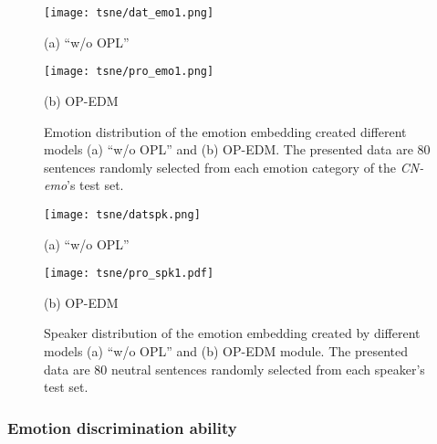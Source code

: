 \documentclass[journal,comsoc]{IEEEtran}
\begin{document}
\begin{figure}[t]
	\centering 
	\begin{minipage}{\linewidth}
		\begin{minipage}{0.49\linewidth}
			\texttt{[image: tsne/dat\_emo1.png]}
			\centerline{(a) ``w/o OPL''}
		\end{minipage}
		\hfill
		\begin{minipage}{0.49\linewidth}
			\texttt{[image: tsne/pro\_emo1.png]}
			\centerline{(b) OP-EDM}
		\end{minipage}
		\vfill
	\end{minipage}	
	\caption{Emotion distribution of the emotion embedding created different models (a) ``w/o OPL'' and (b) OP-EDM. The presented data are $80$ sentences randomly selected from each emotion category of the \textit{CN-emo}'s test set.}
	\label{fig:emb_tsne}
 \vspace{-0.15cm}
\end{figure}
\begin{figure}[t]
	\centering
	\begin{minipage}{\linewidth}
		\begin{minipage}{0.49\linewidth}
			\texttt{[image: tsne/datspk.png]}
			\centerline{(a) ``w/o OPL''}
		\end{minipage}
		\hfill
		\begin{minipage}{0.49\linewidth}
			\texttt{[image: tsne/pro\_spk1.pdf]}
			\centerline{(b) OP-EDM}
		\end{minipage}
		\vfill
	\end{minipage}
	\caption{Speaker distribution of the emotion embedding created by different models (a) ``w/o OPL'' and (b) OP-EDM module. The presented data are $80$ neutral sentences randomly selected from each speaker's test set.}
	\label{fig:spk_tsne}
\vspace{-0.1cm} 
\end{figure}

\subsubsection{Emotion discrimination ability}
\end{document}
